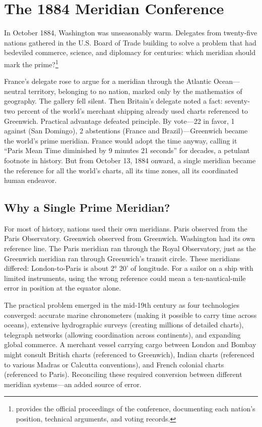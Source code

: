\chapter{The 1884 Meridian Conference}
\label{ch:meridian-conference}

In October 1884, Washington was unseasonably warm. Delegates from twenty-five nations gathered in the U.S. Board of Trade building to solve a problem that had bedeviled commerce, science, and diplomacy for centuries: which meridian should mark the prime?\footnote{\textcite{InternationalMeridianConference1884} provides the official proceedings of the conference, documenting each nation's position, technical arguments, and voting records.}

France's delegate rose to argue for a meridian through the Atlantic Ocean---neutral territory, belonging to no nation, marked only by the mathematics of geography. The gallery fell silent. Then Britain's delegate noted a fact: seventy-two percent of the world's merchant shipping already used charts referenced to Greenwich. Practical advantage defeated principle. By vote---22 in favor, 1 against (San Domingo), 2 abstentions (France and Brazil)---Greenwich became the world's prime meridian. France would adopt the time anyway, calling it ``Paris Mean Time diminished by 9 minutes 21 seconds'' for decades, a petulant footnote in history. But from October 13, 1884 onward, a single meridian became the reference for all the world's charts, all its time zones, all its coordinated human endeavor.

\section{Why a Single Prime Meridian?}

For most of history, nations used their own meridians. Paris observed from the Paris Observatory. Greenwich observed from Greenwich. Washington had its own reference line. The Paris meridian ran through the Royal Observatory, just as the Greenwich meridian ran through Greenwich's transit circle. These meridians differed: London-to-Paris is about 2° 20' of longitude. For a sailor on a ship with limited instruments, using the wrong reference could mean a ten-nautical-mile error in position at the equator alone.

The practical problem emerged in the mid-19th century as four technologies converged: accurate marine chronometers (making it possible to carry time across oceans), extensive hydrographic surveys (creating millions of detailed charts), telegraph networks (allowing coordination across continents), and expanding global commerce. A merchant vessel carrying cargo between London and Bombay might consult British charts (referenced to Greenwich), Indian charts (referenced to various Madras or Calcutta conventions), and French colonial charts (referenced to Paris). Reconciling these required conversion between different meridian systems---an added source of error.

